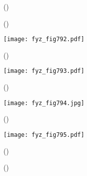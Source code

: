     \begin{figure}[ht!]
      \centering
                     \newline
      \label{fyz:fig790}
      \caption{
               (\cite[s.~748]{Feynman02})}
    \end{figure}

    \begin{figure}[ht!]
      \centering
                     \newline
      \label{fyz:fig791}
      \caption{
               (\cite[s.~748]{Feynman02})}
    \end{figure}

    \begin{figure}[ht!] %
      \centering
      \texttt{[image: fyz\_fig792.pdf]}
      \caption{
               (\cite[s.~707]{Feynman02})}
      \label{fyz:fig792}
    \end{figure}

    \begin{figure}[ht!] %
      \centering
      \texttt{[image: fyz\_fig793.pdf]}
      \caption{
               (\cite[s.~707]{Feynman02})}
      \label{fyz:fig793}
    \end{figure}

    \begin{figure}[ht!] %
      \centering
      \texttt{[image: fyz\_fig794.jpg]}
      \caption{
               (\cite[s.~707]{Feynman02})}
      \label{fyz:fig794}
    \end{figure}

    \begin{figure}[ht!] %
      \centering
      \texttt{[image: fyz\_fig795.pdf]}
      \caption{
               (\cite[s.~707]{Feynman02})}
      \label{fyz:fig795}
    \end{figure}

    \begin{figure}[ht!]
      \centering
                     \newline
      \label{fyz:fig796}
      \caption{
               (\cite[s.~748]{Feynman02})}
    \end{figure}

